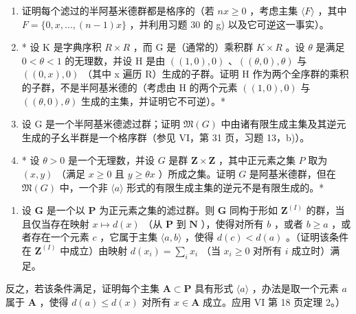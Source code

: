 \begin{enumerate}
\def\labelenumi{\alph{enumi})}
\item
  证明每个滤过的半阿基米德群都是格序的（若 \(nx \geqslant 0\) ，考虑主集 \(\langle F \rangle\) ，其中 \(F = \{0, x, \ldots, (n - 1)x\}\) ，并利用习题 30 的 g) 以及它可逆这一事实）。
\item
  * 设 K 是字典序积 \(R \times R\) ，而 G 是（通常的）乘积群 \(K \times R\) 。设 \(\theta\) 是满足 \(0 < \theta < 1\) 的无理数，并设 H 是由 \(((1, 0), 0)\) 、\(((\theta, 0), \theta)\) 与 \(((0, x), 0)\) （其中 x 遍历 R）生成的子群。证明 H 作为两个全序群的乘积的子群，不是半阿基米德的（考虑由 H 的两个元素 \(((1,0),0)\) 与 \(((\theta ,0),\theta)\) 生成的主集，并证明它不可逆）。*
\item
  设 G 是一个半阿基米德滤过群；证明 \(\mathfrak{M}(G)\) 中由诸有限生成主集及其逆元生成的子幺半群是一个格序群（参见 VI，第 31 页，习题 13，b)）。
\item
  * 设 \(\theta > 0\) 是一个无理数，并设 \(G\) 是群 \(\mathbf{Z} \times \mathbf{Z}\) ，其中正元素之集 \(P\) 取为 \((x, y)\) （满足 \(x \geqslant 0\) 且 \(y \geqslant \theta x\) ）所成之集。证明 \(G\) 是阿基米德群，但在 \(\mathfrak{M}(G)\) 中，一个非 \(\langle a \rangle\) 形式的有限生成主集的逆元不是有限生成的。*
\end{enumerate}

\begin{enumerate}
\def\labelenumi{\arabic{enumi})}
\setcounter{enumi}{35}
\tightlist
\item
  设 \(\mathbf{G}\) 是一个以 \(\mathbf{P}\) 为正元素之集的滤过群。则 \(\mathbf{G}\) 同构于形如 \(\mathbf{Z}^{(I)}\) 的群，当且仅当存在映射 \(x \mapsto d(x)\) （从 \(\mathbf{P}\) 到 \(\mathbf{N}\) ），使得对所有 \(b\) ，或者 \(b \geqslant a\) ，或者存在一个元素 \(c\) ，它属于主集 \(\langle a, b \rangle\) ，使得 \(d(c) < d(a)\) 。（证明该条件在 \(\mathbf{Z}^{(I)}\) 中成立）由映射 \(d(x_{i}) = \sum_{i} x_{i}\) （当 \(x_{i} \geqslant 0\) 对所有 \(i\) 成立时）满足。
\end{enumerate}

反之，若该条件满足，证明每个主集 \(\mathbf{A} \subset \mathbf{P}\) 具有形式 \(\langle a \rangle\) ，办法是取一个元素 \(a\) 属于 \(\mathbf{A}\) ，使得 \(d(a) \leqslant d(x)\) 对所有 \(x \in \mathbf{A}\) 成立。应用 VI 第 18 页定理 2。）
\relax{}
